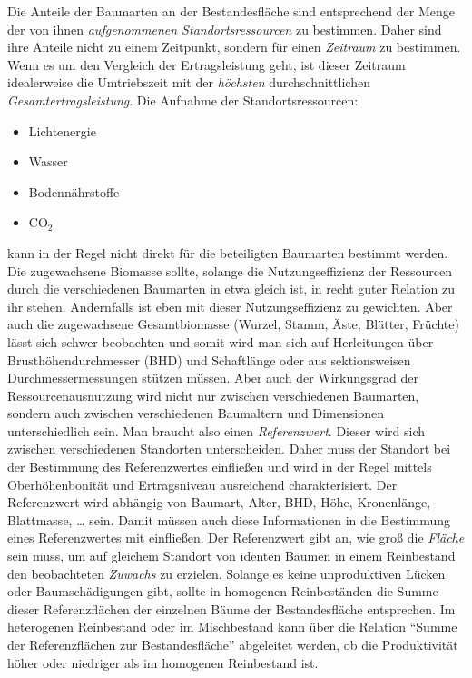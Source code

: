 \documentclass[twocolumn, paper=a4, fontsize=10pt, bibliography=totoc, index=totoc]{scrartcl}
\begin{document}
Die Anteile der Baumarten an der Bestandesfläche sind entsprechend der Menge der
von ihnen \emph{aufgenommenen Standortsressourcen} zu bestimmen. Daher sind ihre
Anteile nicht zu einem Zeitpunkt, sondern für einen \emph{Zeitraum} zu
bestimmen. Wenn es um den Vergleich der Ertragsleistung geht, ist dieser
Zeitraum idealerweise die Umtriebszeit mit der \emph{höchsten}
durchschnittlichen \emph{Gesamtertragsleistung}. Die Aufnahme der
Standortsressourcen:
\begin{itemize}
\item Lichtenergie
\item Wasser
\item Bodennährstoffe
\item CO$_2$
\end{itemize}
kann in der Regel nicht direkt für die beteiligten Baumarten bestimmt werden.
Die zugewachsene Biomasse sollte, solange die Nutzungseffizienz der Ressourcen
durch die verschiedenen Baumarten in etwa gleich ist, in recht guter Relation
zu ihr stehen. Andernfalls ist eben mit dieser Nutzungseffizienz zu gewichten.
Aber auch die zugewachsene Gesamtbiomasse (Wurzel, Stamm, Äste, Blätter,
Früchte) lässt sich schwer beobachten und somit wird man sich auf Herleitungen
über Brusthöhendurchmesser (BHD) und Schaftlänge oder aus sektionsweisen
Durchmessermessungen stützen müssen. Aber auch der Wirkungsgrad der
Ressourcenausnutzung wird nicht nur zwischen verschiedenen Baumarten, sondern
auch zwischen verschiedenen Baumaltern und Dimensionen unterschiedlich sein. Man
braucht also einen \emph{Referenzwert}. Dieser wird sich zwischen verschiedenen
Standorten unterscheiden. Daher muss der Standort bei der Bestimmung des
Referenzwertes einfließen und wird in der Regel mittels Oberhöhenbonität und
Ertragsniveau ausreichend charakterisiert. Der Referenzwert wird abhängig von Baumart, Alter, BHD, Höhe, Kronenlänge,
Blattmasse, \dots{} sein. Damit müssen auch diese Informationen in die Bestimmung
eines Referenzwertes mit einfließen. Der Referenzwert gibt an, wie groß die
\emph{Fläche} sein muss, um auf gleichem Standort von identen Bäumen in einem
Reinbestand den beobachteten \emph{Zuwachs} zu erzielen. Solange es keine
unproduktiven Lücken oder Baumschädigungen gibt, sollte in homogenen
Reinbeständen die Summe dieser Referenzflächen der einzelnen Bäume der
Bestandesfläche entsprechen. Im heterogenen Reinbestand oder im Mischbestand
kann über die Relation \enquote{Summe der Referenzflächen zur Bestandesfläche}
abgeleitet werden, ob die Produktivität höher oder niedriger als im homogenen
Reinbestand ist.
\end{document}
